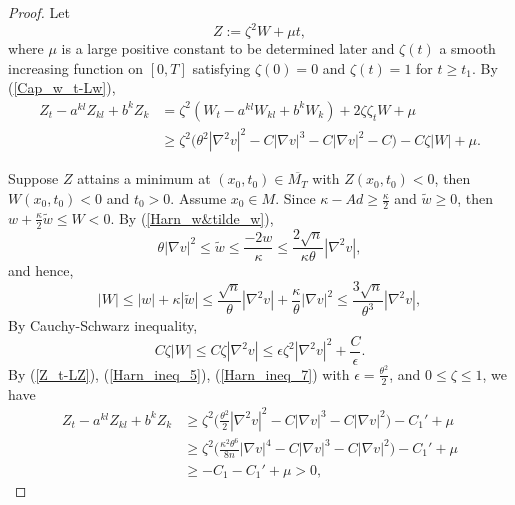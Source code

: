 \documentclass[12pt]{amsart}
\theoremstyle{definition}
\theoremstyle{remark}
\numberwithin{equation}{section}
\begin{document}
\begin{proof}
	Let $$Z := \zeta^2 W + \mu t,$$
	where $\mu$ is a large positive constant to be determined later and $\zeta(t)$ a smooth increasing function on $[0, T]$ satisfying $\zeta(0) = 0$ and $\zeta(t) = 1$ for $t \geq t_1$. 	
	By (\ref{Cap_w_t-Lw}),
	\begin{equation}\label{Z_t-LZ}
	\begin{aligned}
	Z_t - a^{kl} Z_{kl} + b^k Z_k &= \zeta^2 (W_t - a^{kl} W_{kl} + b^k W_k) + 2 \zeta \zeta_t W + \mu \\
	& \geq \zeta^2 \big(\theta^2 |\nabla^2 v|^2 - C|\nabla v|^3 - C |\nabla v|^2 - C\big) - C \zeta |W| + \mu.
	\end{aligned}
	\end{equation}
	
	Suppose $Z$ attains a minimum at $(x_0, t_0) \in \overline{M_T}$ with $Z(x_0, t_0) < 0$,
	then $W(x_0, t_0) < 0$ and $t_0 > 0$. 
	Assume $x_0 \in M$.
	Since $\kappa - Ad \geq \frac{\kappa}{2}$ and $\tilde{w} \geq 0$, then $w + \frac{\kappa}{2}\tilde{w} \leq W <0$.
	By (\ref{Harn_w&tilde_w}),
	\begin{equation}\label{Harn_ineq_5}
	\theta|\nabla v|^2 \leq \tilde{w} \leq \frac{-2w}{\kappa} \leq \frac{2\sqrt{n}}{\kappa \theta} |\nabla^2 v|,
	\end{equation}
	and hence,
	\begin{equation}\label{Harn_ineq_6}
	|W| \leq |w| + \kappa |\tilde{w}| \leq \frac{\sqrt{n}}{\theta} |\nabla^2 v| + \frac{\kappa}{\theta} |\nabla v|^2 \leq \frac{3\sqrt{n}}{\theta^3} |\nabla^2 v|,
	\end{equation}
	By Cauchy-Schwarz inequality,
	\begin{equation}\label{Harn_ineq_7}
	C\zeta |W| \leq C \zeta |\nabla^2 v| \leq \epsilon \zeta^2 |\nabla^2 v|^2 + \frac{C}{\epsilon}.
	\end{equation}
	By (\ref{Z_t-LZ}), (\ref{Harn_ineq_5}), (\ref{Harn_ineq_7}) with $\epsilon = \frac{\theta^2}{2}$, and $0 \leq \zeta \leq 1$, we have
	\begin{equation}\label{Z_t-LZ&Z<0}
	\begin{aligned}
	Z_t - a^{kl} Z_{kl} + b^k Z_k 
	&\geq \zeta^2 \Big(\frac{\theta^2}{2} |\nabla^2 v|^2 - C|\nabla v|^3 - C |\nabla v|^2\Big) - C_1' + \mu \\
	&\geq \zeta^2 \Big(\frac{\kappa^2 \theta^6}{8n} |\nabla v|^4 - C|\nabla v|^3 - C |\nabla v|^2\Big) - C_1' + \mu \\
	&\geq - C_1 - C_1' + \mu >0,
	\end{aligned}
	\end{equation}

\end{proof}
\end{document}
